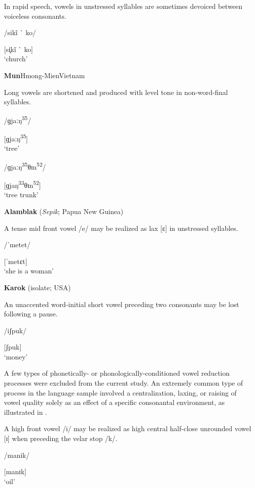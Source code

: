 In rapid speech, vowels in unstressed syllables are sometimes devoiced between voiceless consonants.

/sikĩ \`{} ko/

[si̥kĩ \`{} ko]\\
\glt ‘church’
\citep[18]{Holt1999}
\z

\ea\label{ex:6.7}
 \textbf{Mun}{Hmong-Mien}{Vietnam}

Long vowels are shortened and produced with level tone in non-word-final syllables. 

\ea  /ɡjaːŋ\textsuperscript{35}/

[ɡjaːŋ\textsuperscript{35}]\\
\glt ‘tree’

\ex  /ɡjaːŋ\textsuperscript{35}θɪn\textsuperscript{52}/

[ɡjaŋ\textsuperscript{33}θɪn\textsuperscript{52}]\\
\glt ‘tree trunk’
\citep[117]{Clark2008}
\z
\z

\ea\label{ex:6.8}
  \textbf{Alamblak} (\textit{Sepik}; Papua New Guinea)

A tense mid front vowel /e/ may be realized as lax [ɛ] in unstressed syllables.

/ˈmetet/

[ˈmetɛt]\\
\glt ‘she is a woman’
\citep[38]{Bruce1984}
\z

\ea\label{ex:6.9}
   \textbf{Karok} (isolate; USA)

An unaccented word-initial short vowel preceding two consonants may be lost following a pause. 

/iʃpuk/

[ʃpuk]\\
\glt ‘money’
\citep[53]{Bright1957}
\z

  A few types of phonetically- or phonologically-conditioned vowel reduction processes were excluded from the current study. An extremely common type of process in the language sample involved a centralization, laxing, or raising of vowel quality solely as an effect of a specific consonantal environment, as illustrated in .

\ea\label{ex:6.10}

A high front vowel /i/ may be realized as high central half-close unrounded vowel [ɪ] when preceding the velar stop /k/.

/manik/

[manɪk]\\
\glt ‘oil’
\citep[15]{Dol2007}
\z

